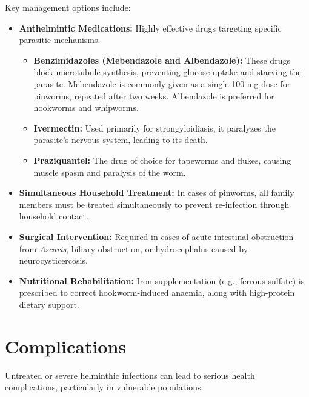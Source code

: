 Key management options include:
\begin{itemize}
    \item \textbf{Anthelmintic Medications:} Highly effective drugs targeting specific parasitic mechanisms.
    \begin{itemize}
        \item \textbf{Benzimidazoles (Mebendazole and Albendazole):} These drugs block microtubule synthesis, preventing glucose uptake and starving the parasite. Mebendazole is commonly given as a single 100 mg dose for pinworms, repeated after two weeks. Albendazole is preferred for hookworms and whipworms.
        \item \textbf{Ivermectin:} Used primarily for strongyloidiasis, it paralyzes the parasite's nervous system, leading to its death.
        \item \textbf{Praziquantel:} The drug of choice for tapeworms and flukes, causing muscle spasm and paralysis of the worm.
    \end{itemize}
    \item \textbf{Simultaneous Household Treatment:} In cases of pinworms, all family members must be treated simultaneously to prevent re-infection through household contact.
    \item \textbf{Surgical Intervention:} Required in cases of acute intestinal obstruction from \textit{Ascaris}, biliary obstruction, or hydrocephalus caused by neurocysticercosis.
    \item \textbf{Nutritional Rehabilitation:} Iron supplementation (e.g., ferrous sulfate) is prescribed to correct hookworm-induced anaemia, along with high-protein dietary support.
\end{itemize}

\section*{Complications}
Untreated or severe helminthic infections can lead to serious health complications, particularly in vulnerable populations.


